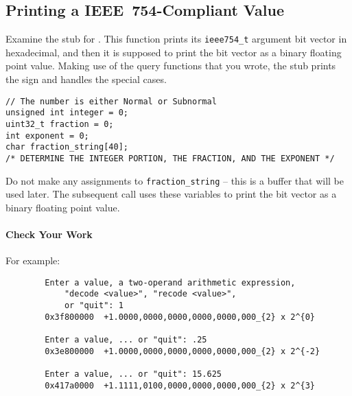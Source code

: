 \subsection{Printing a IEEE~754-Compliant Value} \label{subsec:printing}

Examine the stub for .
This function prints its \lstinline{ieee754_t} argument bit vector in hexadecimal, and then it is supposed to print the bit vector as a binary floating point value.
Making use of the query functions that you wrote, the stub prints the sign and handles the special cases.

\begin{description}
        \begin{lstlisting}
// The number is either Normal or Subnormal
unsigned int integer = 0;
uint32_t fraction = 0;
int exponent = 0;
char fraction_string[40];
/* DETERMINE THE INTEGER PORTION, THE FRACTION, AND THE EXPONENT */
        \end{lstlisting}
\end{description}
Do not make any assignments to \lstinline{fraction_string} -- this is a buffer that will be used later.
The subsequent  call uses these variables to print the bit vector as a binary floating point value.

\paragraph*{Check Your Work}

\begin{description}
\end{description}
For example:

\begin{verbatim}
        Enter a value, a two-operand arithmetic expression,
            "decode <value>", "recode <value>",
            or "quit": 1
        0x3f800000	+1.0000,0000,0000,0000,0000,000_{2} x 2^{0}

        Enter a value, ... or "quit": .25
        0x3e800000	+1.0000,0000,0000,0000,0000,000_{2} x 2^{-2}

        Enter a value, ... or "quit": 15.625
        0x417a0000	+1.1111,0100,0000,0000,0000,000_{2} x 2^{3}
\end{verbatim}


